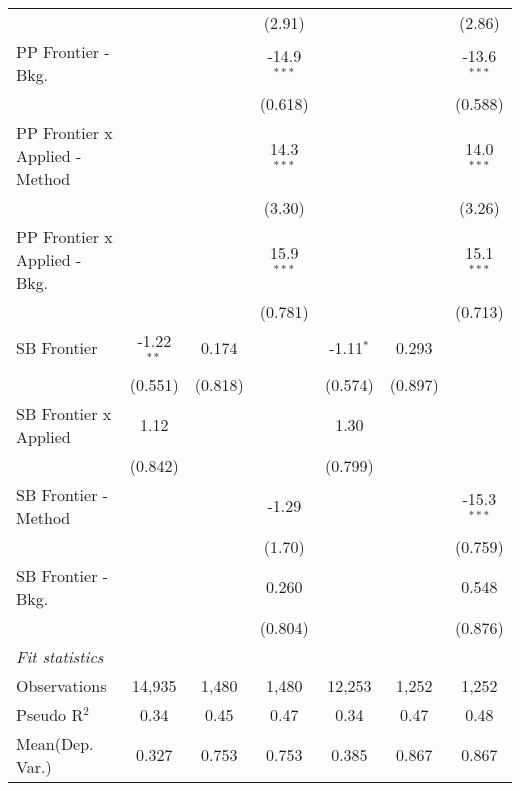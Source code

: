 \begin{tabular}{lcccccc}
                                  &                &                & (2.91)        &                &               & (2.86)\\   
   PP Frontier - Bkg.             &                &                & -14.9$^{***}$ &                &               & -13.6$^{***}$\\   
                                  &                &                & (0.618)       &                &               & (0.588)\\   
   PP Frontier x Applied - Method &                &                & 14.3$^{***}$  &                &               & 14.0$^{***}$\\   
                                  &                &                & (3.30)        &                &               & (3.26)\\   
   PP Frontier x Applied - Bkg.   &                &                & 15.9$^{***}$  &                &               & 15.1$^{***}$\\   
                                  &                &                & (0.781)       &                &               & (0.713)\\   
   SB Frontier                    & -1.22$^{**}$   & 0.174          &               & -1.11$^{*}$    & 0.293         &   \\   
                                  & (0.551)        & (0.818)        &               & (0.574)        & (0.897)       &   \\   
   SB Frontier x Applied          & 1.12           &                &               & 1.30           &               &   \\   
                                  & (0.842)        &                &               & (0.799)        &               &   \\   
   SB Frontier - Method           &                &                & -1.29         &                &               & -15.3$^{***}$\\   
                                  &                &                & (1.70)        &                &               & (0.759)\\   
   SB Frontier - Bkg.             &                &                & 0.260         &                &               & 0.548\\   
                                  &                &                & (0.804)       &                &               & (0.876)\\   
   \midrule
   \emph{Fit statistics}\\
   Observations                   & 14,935         & 1,480          & 1,480         & 12,253         & 1,252         & 1,252\\  
   Pseudo R$^2$                   & 0.34           & 0.45           & 0.47          & 0.34           & 0.47          & 0.48\\  
Mean(Dep. Var.) & 0.327 & 0.753 & 0.753 & 0.385 & 0.867 & 0.867 \\
   

\end{tabular}
